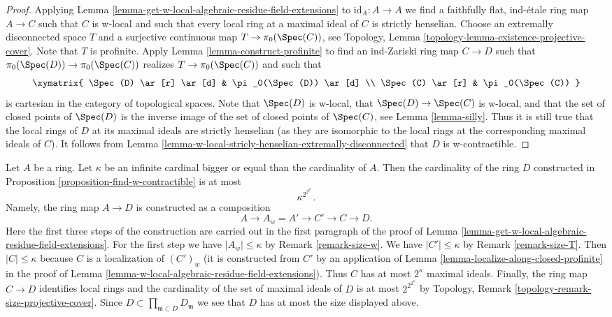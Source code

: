 \begin{proof}
Applying Lemma \ref{lemma-get-w-local-algebraic-residue-field-extensions}
to $\text{id}_A : A \to A$ we find a faithfully flat, ind-\'etale ring map
$A \to C$ such that $C$ is w-local and such that every local ring at a
maximal ideal of $C$ is strictly henselian.
Choose an extremally disconnected space $T$ and a surjective
continuous map $T \to \pi_0(\Spec(C))$, see
Topology, Lemma \ref{topology-lemma-existence-projective-cover}.
Note that $T$ is profinite. Apply Lemma \ref{lemma-construct-profinite}
to find an ind-Zariski ring map $C \to D$ such that
$\pi_0(\Spec(D)) \to \pi_0(\Spec(C))$ realizes $T \to \pi_0(\Spec(C))$
and such that
$$
\xymatrix{
\Spec(D) \ar[r] \ar[d] & \pi_0(\Spec(D)) \ar[d] \\
\Spec(C) \ar[r] & \pi_0(\Spec(C))
}
$$
is cartesian in the category of topological spaces. Note that $\Spec(D)$
is w-local, that $\Spec(D) \to \Spec(C)$ is w-local, and that the
set of closed points of $\Spec(D)$ is the inverse image of the
set of closed points of $\Spec(C)$, see Lemma \ref{lemma-silly}.
Thus it is still true that the local rings of $D$ at its maximal
ideals are strictly henselian (as they are isomorphic to the
local rings at the corresponding maximal ideals of $C$).
It follows from
Lemma \ref{lemma-w-local-stricly-henselian-extremally-disconnected}
that $D$ is w-contractible.
\end{proof}

\begin{remark}
\label{remark-size-w-contractible}
Let $A$ be a ring. Let $\kappa$ be an infinite cardinal bigger or
equal than the cardinality of $A$. Then the cardinality of the
ring $D$ constructed in Proposition \ref{proposition-find-w-contractible}
is at most
$$
\kappa^{2^{2^{2^\kappa}}}.
$$
Namely, the ring map $A \to D$ is
constructed as a composition
$$
A \to A_w = A' \to C' \to C \to D.
$$
Here the first three steps of the construction are carried out
in the first paragraph of the proof of
Lemma \ref{lemma-get-w-local-algebraic-residue-field-extensions}.
For the first step we have $|A_w| \leq \kappa$ by
Remark \ref{remark-size-w}.
We have $|C'| \leq \kappa$ by
Remark \ref{remark-size-T}.
Then $|C| \leq \kappa$ because $C$ is a localization of $(C')_w$
(it is constructed from $C'$ by an application of
Lemma \ref{lemma-localize-along-closed-profinite}
in the proof of Lemma \ref{lemma-w-local-algebraic-residue-field-extensions}).
Thus $C$ has at most $2^\kappa$ maximal ideals.
Finally, the ring map $C \to D$ identifies local rings and the
cardinality of the set of maximal ideals of $D$ is at most
$2^{2^{2^\kappa}}$ by
Topology, Remark \ref{topology-remark-size-projective-cover}.
Since $D \subset \prod_{\mathfrak m \subset D} D_\mathfrak m$ we see
that $D$ has at most the size displayed above.
\end{remark}

